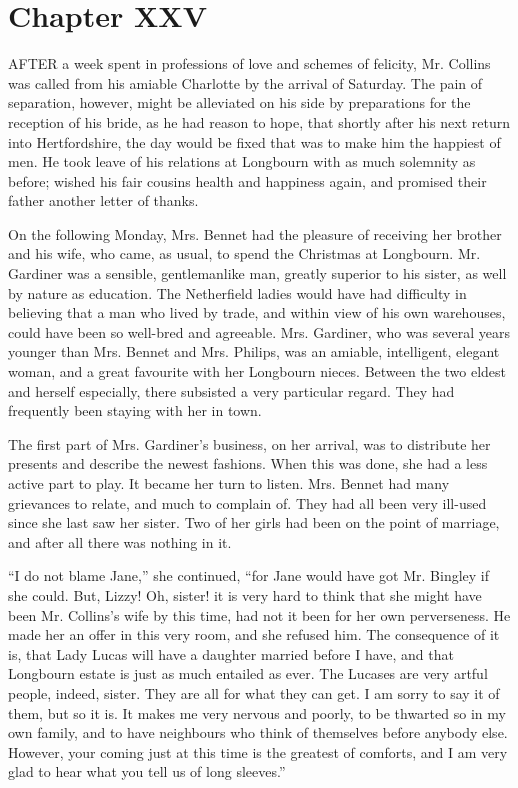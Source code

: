 \documentclass[12pt,openright]{book}
\begin{document}
\chapter{Chapter XXV}

\noindent  AFTER a week spent in professions of love and schemes of felicity, Mr. Collins was called from his amiable Charlotte by the arrival of Saturday. The pain of separation, however, might be alleviated on his side by preparations for the reception of his bride, as he had reason to hope, that shortly after his next return into Hertfordshire, the day would be fixed that was to make him the happiest of men. He took leave of his relations at Longbourn with as much solemnity as before; wished his fair cousins health and happiness again, and promised their father another letter of thanks.

On the following Monday, Mrs. Bennet had the pleasure of receiving her brother and his wife, who came, as usual, to spend the Christmas at Longbourn. Mr. Gardiner was a sensible, gentlemanlike man, greatly superior to his sister, as well by nature as education. The Netherfield ladies would have had difficulty in believing that a man who lived by trade, and within view of his own warehouses, could have been so well-bred and agreeable. Mrs. Gardiner, who was several years younger than Mrs. Bennet and Mrs. Philips, was an amiable, intelligent, elegant woman, and a great favourite with her Longbourn nieces. Between the two eldest and herself especially, there subsisted a very particular regard. They had frequently been staying with her in town.

The first part of Mrs. Gardiner’s business, on her arrival, was to distribute her presents and describe the newest fashions. When this was done, she had a less active part to play. It became her turn to listen. Mrs. Bennet had many grievances to relate, and much to complain of. They had all been very ill-used since she last saw her sister. Two of her girls had been on the point of marriage, and after all there was nothing in it.

“I do not blame Jane,” she continued, “for Jane would have got Mr. Bingley if she could. But, Lizzy! Oh, sister! it is very hard to think that she might have been Mr. Collins’s wife by this time, had not it been for her own perverseness. He made her an offer in this very room, and she refused him. The consequence of it is, that Lady Lucas will have a daughter married before I have, and that Longbourn estate is just as much entailed as ever. The Lucases are very artful people, indeed, sister. They are all for what they can get. I am sorry to say it of them, but so it is. It makes me very nervous and poorly, to be thwarted so in my own family, and to have neighbours who think of themselves before anybody else. However, your coming just at this time is the greatest of comforts, and I am very glad to hear what you tell us of long sleeves.”
\end{document}
